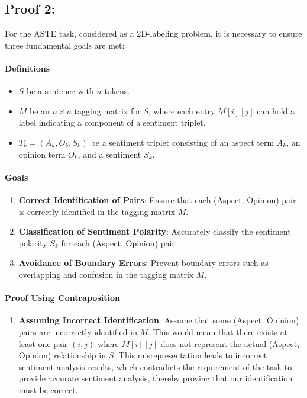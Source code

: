 \documentclass[11pt]{article}
\begin{document}
\subsection{Proof 2: }
\label{Proof 2}
\begin{adjustwidth}{0.9em}{0pt}
For the ASTE task, considered as a 2D-labeling problem, it is necessary to ensure three fundamental goals are met:

\paragraph{Definitions}
\begin{itemize}
    \item \( S \) be a sentence with \( n \) tokens.
    \item \( M \) be an \( n \times n \) tagging matrix for \( S \), where each entry \( M[i][j] \) can hold a label indicating a component of a sentiment triplet.
    \item \( T_k = (A_k, O_k, S_k) \) be a sentiment triplet consisting of an aspect term \( A_k \), an opinion term \( O_k \), and a sentiment \( S_k \).
\end{itemize}

\paragraph{Goals}
\begin{enumerate}
    \item \textbf{Correct Identification of Pairs}: Ensure that each (Aspect, Opinion) pair is correctly identified in the tagging matrix \( M \).
    \item \textbf{Classification of Sentiment Polarity}: Accurately classify the sentiment polarity \( S_k \) for each (Aspect, Opinion) pair.
    \item \textbf{Avoidance of Boundary Errors}: Prevent boundary errors such as overlapping and confusion in the tagging matrix \( M \).
\end{enumerate}

\paragraph{Proof Using Contraposition}
\begin{enumerate}
    \item \textbf{Assuming Incorrect Identification}:
    Assume that some (Aspect, Opinion) pairs are incorrectly identified in \( M \). This would mean that there exists at least one pair \( (i, j) \) where \( M[i][j] \) does not represent the actual (Aspect, Opinion) relationship in \( S \). This misrepresentation leads to incorrect sentiment analysis results, which contradicts the requirement of the task to provide accurate sentiment analysis, thereby proving that our identification must be correct.


\end{enumerate}
\end{adjustwidth}
\end{document}
